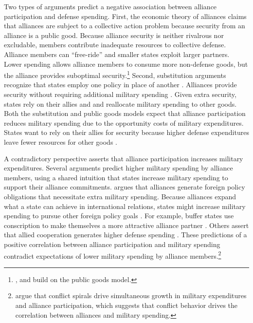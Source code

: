 \documentclass[12pt]{article}
\begin{document}
Two types of arguments predict a negative association between alliance participation and defense spending. 
First, the economic theory of alliances \citep{OlsonZeckhauser1966} claims that alliances are subject to a collective action problem because security from an alliance is a public good.
Because alliance security is neither rivalrous nor excludable, members contribute inadequate resources to collective defense. 
Alliance members can ``free-ride'' and smaller states exploit larger partners. 
Lower spending allows alliance members to consume more non-defense goods, but the alliance provides suboptimal security.\footnote{\citet{SandlerForbes1980}, \citet{Oneal1990} and \citet{SandlerHartley2001} build on the public goods model.} 
Second, substitution arguments recognize that states employ one policy in place of another \citep{MostStarr1989}.
Alliances provide security without requiring additional military spending \citep{Morrow1993, Conybeare1994}. 
Given extra security, states rely on their allies and and reallocate military spending to other goods. 
Both the substitution and public goods models expect that alliance participation reduces military spending due to the opportunity costs of military expenditures. 
States want to rely on their allies for security because higher defense expenditures leave fewer resources for other goods \citep{Fordham1998, Fearon2018}.


A contradictory perspective asserts that alliance participation increases military expenditures. 
Several arguments predict higher military spending by alliance members, using a shared intuition that states increase military spending to support their alliance commitments. 
\citet{Diehl1994} argues that alliances generate foreign policy obligations that necessitate extra military spending.
Because alliances expand what a state can achieve in international relations, states might increase military spending to pursue other foreign policy goals \citep{MorganPalmer2006}.
For example, buffer states use conscription to make themselves a more attractive alliance partner \citep{Horowitzetal2017}.
Others assert that allied cooperation generates higher defense spending \citep{Palmer1990, QuirozFlores2011}. 
These predictions of a positive correlation between alliance participation and military spending contradict expectations of lower military spending by alliance members.\footnote{
\citet{SeneseVasquez2008} argue that conflict spirals drive simultaneous growth in military expenditures and alliance participation, which suggests that conflict behavior drives the correlation between alliances and military spending. 
}
\end{document}
